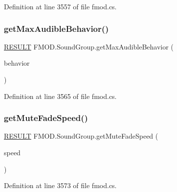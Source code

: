 Definition at line 3557 of file fmod.\+cs.

\mbox{\label{class_f_m_o_d_1_1_sound_group_a972114fe709bbbbb765c13703b87c83c}} 
\subsubsection{\texorpdfstring{get\+Max\+Audible\+Behavior()}{getMaxAudibleBehavior()}}
{\footnotesize\ttfamily \hyperlink{namespace_f_m_o_d_a305d1176ef3f8c8815861a60407ac33d}{R\+E\+S\+U\+LT} F\+M\+O\+D.\+Sound\+Group.\+get\+Max\+Audible\+Behavior (\begin{DoxyParamCaption}\item[{out \hyperlink{namespace_f_m_o_d_a94f1c442afacdfb52f62fc4ef91f425b}{S\+O\+U\+N\+D\+G\+R\+O\+U\+P\+\_\+\+B\+E\+H\+A\+V\+I\+OR}}]{behavior }\end{DoxyParamCaption})}



Definition at line 3565 of file fmod.\+cs.

\mbox{\label{class_f_m_o_d_1_1_sound_group_a482cb6a3ff5236871d63325f16f931ae}} 
\subsubsection{\texorpdfstring{get\+Mute\+Fade\+Speed()}{getMuteFadeSpeed()}}
{\footnotesize\ttfamily \hyperlink{namespace_f_m_o_d_a305d1176ef3f8c8815861a60407ac33d}{R\+E\+S\+U\+LT} F\+M\+O\+D.\+Sound\+Group.\+get\+Mute\+Fade\+Speed (\begin{DoxyParamCaption}\item[{out float}]{speed }\end{DoxyParamCaption})}



Definition at line 3573 of file fmod.\+cs.

\mbox{\label{class_f_m_o_d_1_1_sound_group_a3356275a6774c1f99bad0bf61682ac45}} 

